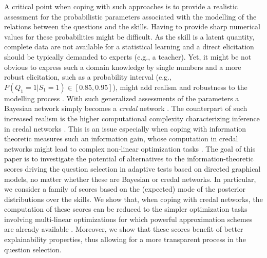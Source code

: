 \documentclass[runningheads]{llncs}
\begin{document}
A critical point when coping with such approaches is to provide a realistic assessment for the probabilistic parameters associated with the modelling of the relations between the questions and the skills. Having to provide sharp numerical values for these probabilities might be difficult. As the skill is a latent quantity, complete data are not available for a statistical learning and a direct elicitation should be typically demanded to experts (e.g., a teacher). Yet, it might be not obvious to express such a domain knowledge by single numbers and a more robust elicitation, such as a probability interval (e.g., $P(Q_1=1|S_1=1)\in[0.85,0.95]$), might add realism and robustness to the modelling process \cite{hajek2012rationality}. With such generalized assessments of the parameters a Bayesian network simply becomes a \emph{credal} network \cite{antonucci2010d}. The counterpart of such increased realism is the higher computational complexity characterizing inference in credal networks \cite{maua14jair}. This is an issue especially when coping with information theoretic measures such an information gain, whose computation in credal networks might lead to complex non-linear optimization tasks \cite{mangili2017b}. The goal of this paper is to investigate the potential of alternatives to the information-theoretic scores driving the question selection in adaptive tests based on directed graphical models, no matter whether these are Bayesian or credal networks. In particular, we consider a family of scores based on the (expected) mode of the posterior distributions over the skills. We show that, when coping with credal networks, the computation of these scores can be reduced to the simpler optimization tasks involving multi-linear optimizations for which powerful approximation schemes are already available \cite{antonucci2013a}. Moreover, we show that these scores benefit of better explainability properties, thus allowing for a more transparent process in the question selection.
\end{document}
